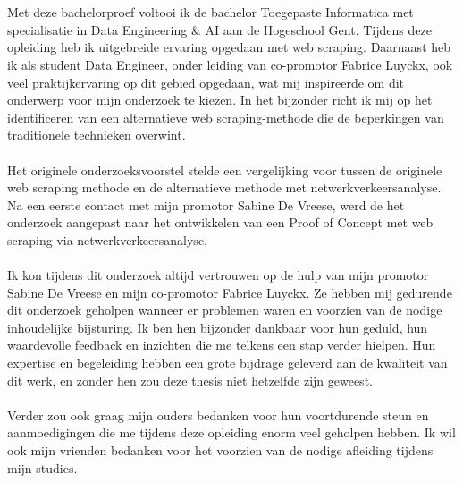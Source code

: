 
\chapter*{}%
\label{ch:voorwoord}


Met deze bachelorproef voltooi ik de bachelor Toegepaste Informatica met specialisatie in Data Engineering \& AI aan de Hogeschool Gent. Tijdens deze opleiding heb ik uitgebreide ervaring opgedaan met web scraping. Daarnaast heb ik als student Data Engineer, onder leiding van co-promotor Fabrice Luyckx, ook veel praktijkervaring op dit gebied opgedaan, wat mij inspireerde om dit onderwerp voor mijn onderzoek te kiezen. In het bijzonder richt ik mij op het identificeren van een alternatieve web scraping-methode die de beperkingen van traditionele technieken overwint.
\\ \\
Het originele onderzoeksvoorstel stelde een vergelijking voor tussen de originele web scraping methode en de alternatieve methode met netwerkverkeersanalyse. Na een eerste contact met mijn promotor Sabine De Vreese, werd de het onderzoek aangepast naar het ontwikkelen van een Proof of Concept met web scraping via netwerkverkeersanalyse.
\\ \\
Ik kon tijdens dit onderzoek altijd vertrouwen op de hulp van mijn promotor Sabine De Vreese en mijn co-promotor Fabrice Luyckx. Ze hebben mij gedurende dit onderzoek geholpen wanneer er problemen waren en voorzien van de nodige inhoudelijke bijsturing. Ik ben hen bijzonder dankbaar voor hun geduld, hun waardevolle feedback en inzichten die me telkens een stap verder hielpen. Hun expertise en begeleiding hebben een grote bijdrage geleverd aan de kwaliteit van dit werk, en zonder hen zou deze thesis niet hetzelfde zijn geweest.
\\ \\
Verder zou ook graag mijn ouders bedanken voor hun voortdurende steun en aanmoedigingen die me tijdens deze opleiding enorm veel geholpen hebben. Ik wil ook mijn vrienden bedanken voor het voorzien van de nodige afleiding tijdens mijn studies.